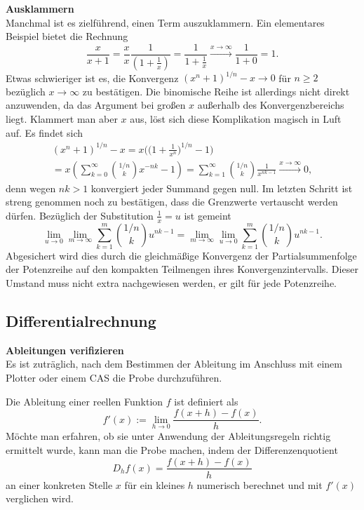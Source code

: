 \documentclass[paper=180mm:225mm,pagesize=auto,fleqn,twoside,11pt,dvipdfmx]{scrartcl}
\theoremstyle{rmbox}
\newenvironment{Rezept}[1]{\strong{#1}\\}{}
\newcommand{\strong}[1]{\textsf{\textbf{#1}}}
\begin{document}
\begin{Rezept}{Ausklammern}
Manchmal ist es zielführend, einen Term auszuklammern.
\end{Rezept}
Ein elementares Beispiel bietet die Rechnung
\[\frac{x}{x+1} = \frac{x}{x}\frac{1}{(1+\frac{1}{x})}
= \frac{1}{1+\frac{1}{x}}\xrightarrow{x\to\infty}\frac{1}{1+0} = 1.\]
Etwas schwieriger ist es, die Konvergenz $(x^n+1)^{1/n}-x\to 0$ für
$n\ge 2$ bezüglich $x\to\infty$ zu bestätigen. Die binomische Reihe
ist allerdings nicht direkt anzuwenden, da das Argument bei großen $x$
außerhalb des Konvergenzbereichs liegt. Klammert man aber $x$ aus, löst
sich diese Komplikation magisch in Luft auf. Es findet sich
\begin{gather*}
(x^n+1)^{1/n}-x = x\Big(\Big(1+\frac{1}{x^n}\Big)^{1/n}-1\Big)\\
= x(\sum_{k=0}^\infty\binom{1/n}{k}x^{-nk}-1)
= \sum_{k=1}^\infty\binom{1/n}{k}\frac{1}{x^{nk-1}}
\xrightarrow{x\to\infty} 0,
\end{gather*}
denn wegen $nk>1$ konvergiert jeder Summand gegen null. Im letzten
Schritt ist streng genommen noch zu bestätigen, dass die Grenzwerte
vertauscht werden dürfen. Bezüglich der Substitution $\frac{1}{x}=u$
ist gemeint
\[\lim_{u\to 0}\lim_{m\to\infty}\sum_{k=1}^m\binom{1/n}{k}u^{nk-1}
= \lim_{m\to\infty}\lim_{u\to 0}\sum_{k=1}^m\binom{1/n}{k}u^{nk-1}.\]
Abgesichert wird dies durch die gleichmäßige Konvergenz der
Partialsummenfolge der Potenzreihe auf den kompakten Teilmengen ihres
Konvergenzintervalls. Dieser Umstand muss nicht extra nachgewiesen
werden, er gilt für jede Potenzreihe.

\subsection{Differentialrechnung}

\begin{Rezept}{Ableitungen verifizieren}
Es ist zuträglich, nach dem Bestimmen der Ableitung im Anschluss
mit einem Plotter oder einem CAS die Probe durchzuführen.
\end{Rezept}

\noindent
Die Ableitung einer reellen Funktion $f$ ist definiert als%
\[f'(x) := \lim_{h\to 0}\frac{f(x+h)-f(x)}{h}.\]
Möchte man erfahren, ob sie unter Anwendung
der Ableitungsregeln richtig ermittelt wurde, kann man die Probe
machen, indem der Differenzenquotient%
\[D_h f(x) = \frac{f(x+h)-f(x)}{h}\]
an einer konkreten Stelle $x$ für ein kleines $h$ numerisch
berechnet und mit $f'(x)$ verglichen wird.
\end{document}
